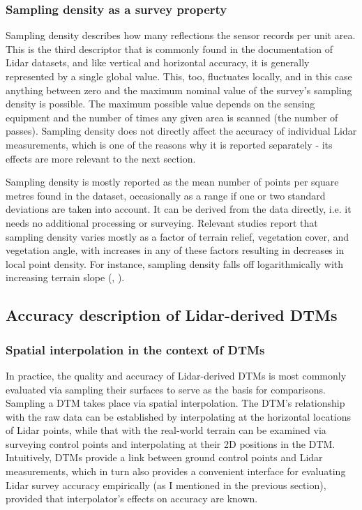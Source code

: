 \subsubsection{Sampling density as a survey property}

Sampling density describes how many reflections the sensor records per unit area. This is the third descriptor that is commonly found in the documentation of Lidar datasets, and like vertical and horizontal accuracy, it is generally represented by a single global value. This, too, fluctuates locally, and in this case anything between zero and the maximum nominal value of the survey's sampling density is possible. The maximum possible value depends on the sensing equipment and the number of times any given area is scanned (the number of passes). Sampling density does not directly affect the accuracy of individual Lidar measurements, which is one of the reasons why it is reported separately - its effects are more relevant to the next section.

Sampling density is mostly reported as the mean number of points per square metres found in the dataset, occasionally as a range if one or two standard deviations are taken into account. It can be derived from the data directly, i.e. it needs no additional processing or surveying. Relevant studies report that sampling density varies mostly as a factor of terrain relief, vegetation cover, and vegetation angle, with increases in any of these factors resulting in decreases in local point density. For instance, sampling density falls off logarithmically with increasing terrain slope (\cite{peng_shih_2006}, \cite{chow_hodgson_2009}).

\subsection{Accuracy description of Lidar-derived DTMs}
\label{sub:lidaraccuracy_dem}

\subsubsection{Spatial interpolation in the context of DTMs}

In practice, the quality and accuracy of Lidar-derived DTMs is most commonly evaluated via sampling their surfaces to serve as the basis for comparisons. Sampling a DTM takes place via spatial interpolation. The DTM's relationship with the raw data can be established by interpolating at the horizontal locations of Lidar points, while that with the real-world terrain can be examined via surveying control points and interpolating at their 2D positions in the DTM. Intuitively, DTMs provide a link between ground control points and Lidar measurements, which in turn also provides a convenient interface for evaluating Lidar survey accuracy empirically (as I mentioned in the previous section), provided that interpolator's effects on accuracy are known.

